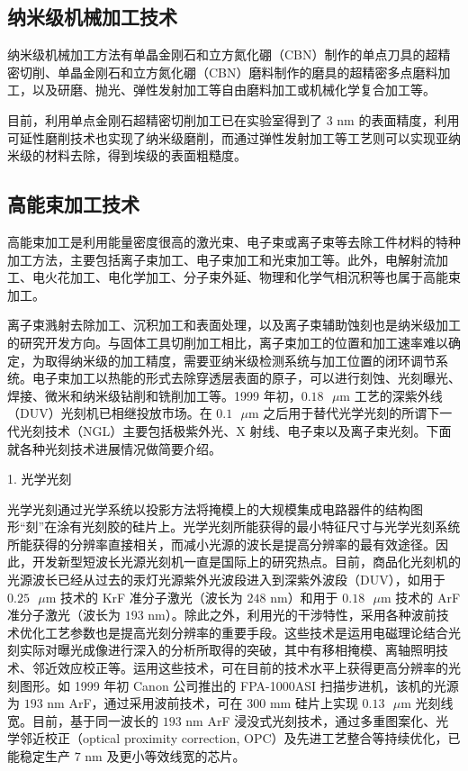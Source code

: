 \documentclass[UTF8]{ctexbook}
\newcommand{\◎}{\ensuremath{\bigcirc}}
\begin{document}
\subsection{纳米级机械加工技术}

纳米级机械加工方法有单晶金刚石和立方氮化硼（CBN）制作的单点刀具的超精密切削、单晶金刚石和立方氮化硼（CBN）磨料制作的磨具的超精密多点磨料加工，以及研磨、抛光、弹性发射加工等自由磨料加工或机械化学复合加工等。

目前，利用单点金刚石超精密切削加工已在实验室得到了 $3\text{ nm}$ 的表面精度，利用可延性磨削技术也实现了纳米级磨削，而通过弹性发射加工等工艺则可以实现亚纳米级的材料去除，得到埃级的表面粗糙度。

\subsection{高能束加工技术}

高能束加工是利用能量密度很高的激光束、电子束或离子束等去除工件材料的特种加工方法，主要包括离子束加工、电子束加工和光束加工等。此外，电解射流加工、电火花加工、电化学加工、分子束外延、物理和化学气相沉积等也属于高能束加工。

离子束溅射去除加工、沉积加工和表面处理，以及离子束辅助蚀刻也是纳米级加工的研究开发方向。与固体工具切削加工相比，离子束加工的位置和加工速率难以确定，为取得纳米级的加工精度，需要亚纳米级检测系统与加工位置的闭环调节系统。电子束加工以热能的形式去除穿透层表面的原子，可以进行刻蚀、光刻曝光、焊接、微米和纳米级钻削和铣削加工等。1999 年初，$0.18\text{ }\mu\text{m}$ 工艺的深紫外线（DUV）光刻机已相继投放市场。在 $0.1\text{ }\mu\text{m}$ 之后用于替代光学光刻的所谓下一代光刻技术（NGL）主要包括极紫外光、X 射线、电子束以及离子束光刻。下面就各种光刻技术进展情况做简要介绍。

1. 光学光刻

光学光刻通过光学系统以投影方法将掩模上的大规模集成电路器件的结构图形“刻”在涂有光刻胶的硅片上。光学光刻所能获得的最小特征尺寸与光学光刻系统所能获得的分辨率直接相关，而减小光源的波长是提高分辨率的最有效途径。因此，开发新型短波长光源光刻机一直是国际上的研究热点。目前，商品化光刻机的光源波长已经从过去的汞灯光源紫外光波段进入到深紫外波段（DUV），如用于 $0.25\text{ }\mu\text{m}$ 技术的 KrF 准分子激光（波长为 $248\text{ nm}$）和用于 $0.18\text{ }\mu\text{m}$ 技术的 ArF 准分子激光（波长为 $193\text{ nm}$）。除此之外，利用光的干涉特性，采用各种波前技术优化工艺参数也是提高光刻分辨率的重要手段。这些技术是运用电磁理论结合光刻实际对曝光成像进行深入的分析所取得的突破，其中有移相掩模、离轴照明技术、邻近效应校正等。运用这些技术，可在目前的技术水平上获得更高分辨率的光刻图形。如 1999 年初 Canon 公司推出的 FPA-1000ASI 扫描步进机，该机的光源为 $193\text{ nm}$ ArF，通过采用波前技术，可在 $300\text{ mm}$ 硅片上实现 $0.13\text{ }\mu\text{m}$ 光刻线宽。目前，基于同一波长的 $193\text{ nm}$ ArF 浸没式光刻技术，通过多重图案化、光学邻近校正（optical proximity correction, OPC）及先进工艺整合等持续优化，已能稳定生产 $7\text{ nm}$ 及更小等效线宽的芯片。
\end{document}

